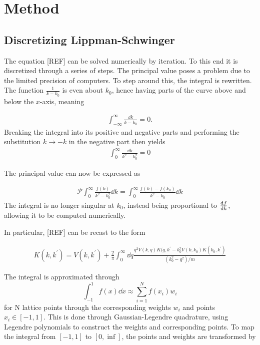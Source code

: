 \section{Method}\label{sec:Method}

\subsection{Discretizing Lippman-Schwinger}

The equation [REF] can be solved numerically by iteration. To this end it is
discretized through a series of steps. The principal value poses a problem due to the limited precision of computers.
To step around this, the integral is rewritten. The function
\(\frac{1}{k-k_{0}}\) is even about \(k_{0}\), hence having parts of the curve
above and below the \(x\)-axis, meaning

\begin{align*}
  \int_{-\infty}^{\infty}\frac{\dd k}{k-k_{0}} = 0.
\end{align*}
Breaking the integral into its positive and negative parts and performing the
substitution \(k\to -k\) in the negative part then yields
\begin{align*}
  \int_{0}^{\infty}\frac{\dd k}{k^{2}-k_{0}^{2}} = 0
\end{align*}

The principal value can now be expressed as

\begin{align*}
  \mathcal{P}\int_{0}^{\infty}\frac{f(k)}{k^{2}-k_{0}^{2}} \dd k = \int_{0}^{\infty}\frac{f(k)-f(k_{0})}{k^{2}-k_{0}}\dd k
\end{align*}
The integral is no longer singular at \(k_{0}\), instead being proportional to
\(\dv{f}{k}\), allowing it to be computed numerically.

In particular, [REF] can be recast to the form

\begin{align*}
  K(k, k^{\prime}) = V(k, k^{\prime}) + \frac{2}{\pi}\int_{0}^{\infty}
  \dd q \frac{q^{2}V(k,q)K(q,k^{\prime} - k^{2}_{0}V(k, k_{0})K(k_{0},k^{\prime})}{(k_{0}^{2}-q^{2})/m}
\end{align*}

The integral is approximated through
\begin{equation*}
  \int_{-1}^{1}f(x)\dd x \approx \sum_{i=1}^{N}f(x_{i})w_{i}
\end{equation*}
for N lattice points through the corresponding weights \(w_{i}\) and points
\(x_{i}\in [-1, 1]\). This is done through Gaussian-Legendre quadrature, using
Legendre polynomials to construct the weights and corresponding points. To map
the integral from \([-1, 1]\) to \([0, \inf]\), the points and weights are
transformed by

